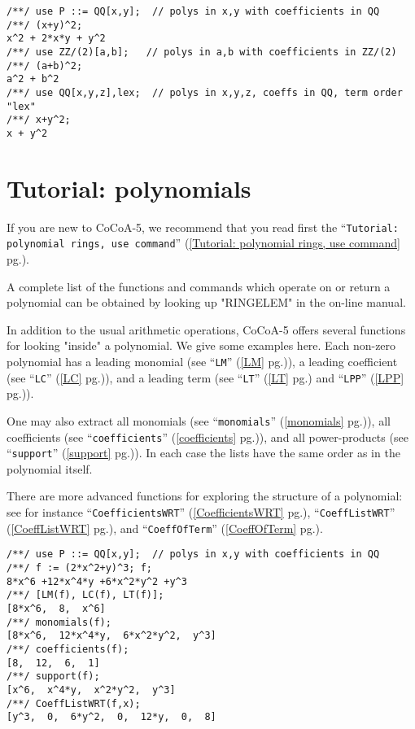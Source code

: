 \documentclass[a4paper]{mybook}
\begin{document}
\begin{Verbatim}[label=example, rulecolor=\color{PineGreen}, frame=single]
/**/ use P ::= QQ[x,y];  // polys in x,y with coefficients in QQ
/**/ (x+y)^2;
x^2 + 2*x*y + y^2
/**/ use ZZ/(2)[a,b];   // polys in a,b with coefficients in ZZ/(2)
/**/ (a+b)^2;
a^2 + b^2
/**/ use QQ[x,y,z],lex;  // polys in x,y,z, coeffs in QQ, term order "lex"
/**/ x+y^2;
x + y^2
\end{Verbatim}



\section{Tutorial: polynomials}
\label{Tutorial: polynomials}

        
If you are new to CoCoA-5, we recommend that you read first the
``\verb&Tutorial: polynomial rings, use command&'' (\ref{Tutorial: polynomial rings, use command} pg.\pageref{Tutorial: polynomial rings, use command}).
\par 
A complete list of the functions and commands which operate on
or return a polynomial can be obtained by looking up "RINGELEM"
in the on-line manual.
\par 
In addition to the usual arithmetic operations, CoCoA-5 offers
several functions for looking "inside" a polynomial.  We give
some examples here.  Each non-zero polynomial has a leading
monomial (see ``\verb&LM&'' (\ref{LM} pg.\pageref{LM})), a leading coefficient (see ``\verb&LC&'' (\ref{LC} pg.\pageref{LC})), and a
leading term (see ``\verb&LT&'' (\ref{LT} pg.\pageref{LT}) and ``\verb&LPP&'' (\ref{LPP} pg.\pageref{LPP})).
\par 
One may also extract all monomials (see ``\verb&monomials&'' (\ref{monomials} pg.\pageref{monomials})), all
coefficients (see ``\verb&coefficients&'' (\ref{coefficients} pg.\pageref{coefficients})), and all power-products
(see ``\verb&support&'' (\ref{support} pg.\pageref{support})).  In each case the lists have the same order
as in the polynomial itself.
\par 
There are more advanced functions for exploring the structure of
a polynomial: see for instance ``\verb&CoefficientsWRT&'' (\ref{CoefficientsWRT} pg.\pageref{CoefficientsWRT}), ``\verb&CoeffListWRT&'' (\ref{CoeffListWRT} pg.\pageref{CoeffListWRT}),
and ``\verb&CoeffOfTerm&'' (\ref{CoeffOfTerm} pg.\pageref{CoeffOfTerm}).

\begin{Verbatim}[label=example, rulecolor=\color{PineGreen}, frame=single]
/**/ use P ::= QQ[x,y];  // polys in x,y with coefficients in QQ
/**/ f := (2*x^2+y)^3; f;
8*x^6 +12*x^4*y +6*x^2*y^2 +y^3
/**/ [LM(f), LC(f), LT(f)];
[8*x^6,  8,  x^6]
/**/ monomials(f);
[8*x^6,  12*x^4*y,  6*x^2*y^2,  y^3]
/**/ coefficients(f);
[8,  12,  6,  1]
/**/ support(f);
[x^6,  x^4*y,  x^2*y^2,  y^3]
/**/ CoeffListWRT(f,x);
[y^3,  0,  6*y^2,  0,  12*y,  0,  8]
\end{Verbatim}
\end{document}
